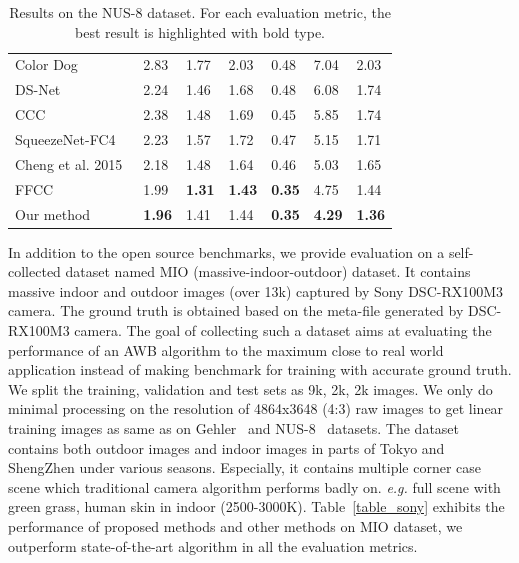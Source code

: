 \documentclass[10pt,twocolumn,letterpaper]{article}
\begin{document}
\begin{table}[tb]
{\begin{tabular}{l|llllll}
Color Dog~\cite{banic2015color}& 2.83 & 1.77 & 2.03 & 0.48 & 7.04 & 2.03 \\
DS-Net~\cite{shi2016deep}& 2.24 & 1.46 & 1.68 & 0.48 & 6.08 & 1.74\\
CCC~\cite{barron2015convolutional}& 2.38 & 1.48 & 1.69 & 0.45 & 5.85 & 1.74 \\
SqueezeNet-FC4~\cite{hu2017fc}& 2.23 & 1.57 & 1.72 & 0.47 & 5.15 & 1.71 \\
Cheng et al. 2015~\cite{cheng2015effective}& 2.18 & 1.48 & 1.64 & 0.46 & 5.03 & 1.65 \\
FFCC~\cite{DBLP:journals/corr/BarronT16}& 1.99 & \textbf{1.31} & \textbf{1.43} & \textbf{0.35} & 4.75 & 1.44\\
\hline
Our method & \textbf{1.96} & 1.41 & 1.44 & \textbf{0.35} & \textbf{4.29} & \textbf{1.36} \\
\hline
\end{tabular}
}
\caption{Results on the NUS-8 dataset.
For each evaluation metric, the best result is highlighted with bold type.}
\label{table_nus8}
\end{table}


In addition to the open source benchmarks, we provide evaluation on a self-collected dataset named MIO (massive-indoor-outdoor) dataset.
It contains massive indoor and outdoor images (over 13k) captured by Sony DSC-RX100M3 camera.
The ground truth is obtained based on the meta-file generated by DSC-RX100M3 camera.
The goal of collecting such a dataset aims at evaluating the performance of an AWB algorithm to
the maximum close to real world application instead of making benchmark for training with accurate ground truth.
We split the training, validation and test sets as 9k, 2k, 2k images.
We only do minimal processing on the resolution of 4864x3648 (4:3) raw images to get linear training images as same as on
Gehler~\cite{gehler2008bayesian} and NUS-8~\cite{cheng2014illuminant} datasets.
The dataset contains both outdoor images and indoor images in parts of Tokyo and ShengZhen under various seasons.
Especially, it contains multiple corner case scene which traditional camera algorithm performs badly on.
\textit{e.g.} full scene with green grass, human skin in indoor (2500-3000K).
Table~\ref{table_sony} exhibits the performance of proposed methods and other methods on MIO dataset,
we outperform state-of-the-art algorithm in all the evaluation metrics.
\end{document}
